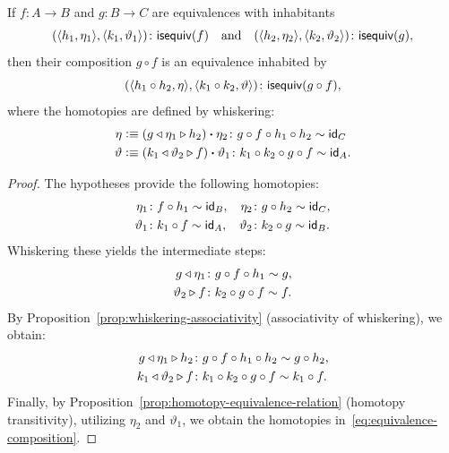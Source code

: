 \begin{lem}\label{lem:equivalence-composition}
    If\/ $f \colon A \to B$ and\/ $g \colon B \to C$ are equivalences with inhabitants
    \[
        (\dep{h_1,\eta_1},\dep{k_1,\vartheta_1})
            \colon\fun{isequiv}(f)
        \quad\text{and}\quad
        (\dep{h_2,\eta_2},\dep{k_2,\vartheta_2})
            \colon\fun{isequiv}(g),
    \]
    then their composition\/ $g\circ f$ is an equivalence inhabited by
    \[
        (\dep{h_1\circ h_2,\eta},\dep{k_1\circ k_2,\vartheta})
            \colon\fun{isequiv}(g\circ f),
    \]
    where the homotopies are defined by whiskering:
    \begin{equation}\label{eq:equivalence-composition}
        \begin{aligned}
            \eta&\defeq
                (g\lwct\eta_1\rwct h_2)\ct\eta_2
                    \colon g\circ f\circ h_1\circ h_2\sim\id_C\\
            \vartheta&\defeq
                (k_1\lwct\vartheta_2\rwct f)\ct\vartheta_1
                    \colon k_1\circ k_2\circ g \circ f\sim \id_A.
        \end{aligned}
    \end{equation}
\end{lem}

\begin{proof}
    The hypotheses provide the following homotopies:
    \begin{align*}
        \eta_1 &\colon f\circ h_1\sim\id_B, &
        \eta_2 &\colon g\circ h_2\sim\id_C, \\
        \vartheta_1 &\colon k_1\circ f\sim\id_A, &
        \vartheta_2 &\colon k_2\circ g\sim\id_B.
    \end{align*}
    Whiskering these yields the intermediate steps:
    \begin{align*}
        g\lwct\eta_1 &\colon g\circ f\circ h_1\sim g, \\
        \vartheta_2\rwct f&\colon k_2\circ g\circ f\sim f.
    \end{align*}
    By Proposition~\ref{prop:whiskering-associativity} (associativity of whiskering), we obtain:
    \begin{align*}
        g\lwct\eta_1\rwct h_2 &\colon g\circ f\circ h_1\circ h_2\sim g\circ h_2, \\
        k_1\lwct\vartheta_2\rwct f &\colon k_1\circ k_2\circ g\circ f\sim k_1\circ f.
    \end{align*}
    Finally, by Proposition~\ref{prop:homotopy-equivalence-relation} (homotopy transitivity), utilizing\/ $\eta_2$ and\/ $\vartheta_1$, we obtain the homotopies in~\eqref{eq:equivalence-composition}.
\end{proof}

